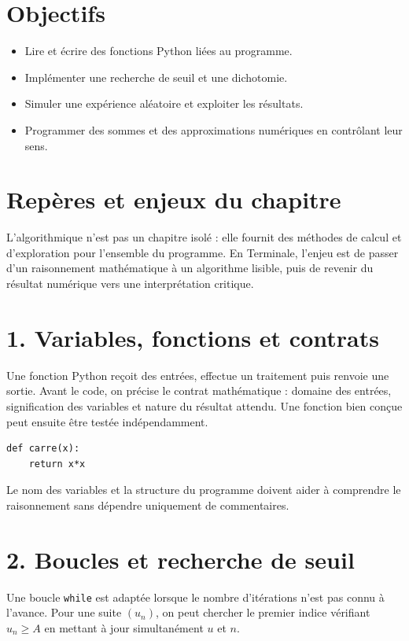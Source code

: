
\section{Objectifs}
\begin{itemize}
\item Lire et écrire des fonctions Python liées au programme.
\item Implémenter une recherche de seuil et une dichotomie.
\item Simuler une expérience aléatoire et exploiter les résultats.
\item Programmer des sommes et des approximations numériques en contrôlant leur sens.
\end{itemize}

\section{Repères et enjeux du chapitre}
L’algorithmique n’est pas un chapitre isolé : elle fournit des méthodes de calcul et d’exploration pour l’ensemble du programme. En Terminale, l’enjeu est de passer d’un raisonnement mathématique à un algorithme lisible, puis de revenir du résultat numérique vers une interprétation critique.

\section{1. Variables, fonctions et contrats}
Une fonction Python reçoit des entrées, effectue un traitement puis renvoie une sortie. Avant le code, on précise le contrat mathématique : domaine des entrées, signification des variables et nature du résultat attendu. Une fonction bien conçue peut ensuite être testée indépendamment.

\begin{verbatim}
def carre(x):
    return x*x
\end{verbatim}

Le nom des variables et la structure du programme doivent aider à comprendre le raisonnement sans dépendre uniquement de commentaires.

\section{2. Boucles et recherche de seuil}
Une boucle \texttt{while} est adaptée lorsque le nombre d’itérations n’est pas connu à l’avance. Pour une suite $(u_n)$, on peut chercher le premier indice vérifiant $u_n\geq A$ en mettant à jour simultanément $u$ et $n$.

